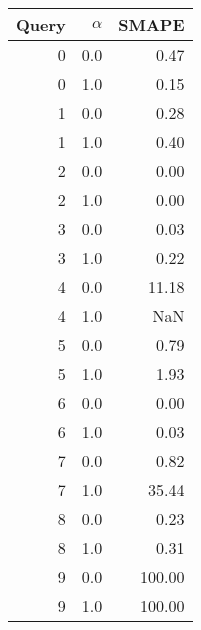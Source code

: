 \begin{tabular}{rrr}
\toprule
 Query &  $\alpha$ &  SMAPE \\
\midrule
     0 &     0.0 &   0.47 \\
     0 &     1.0 &   0.15 \\
     1 &     0.0 &   0.28 \\
     1 &     1.0 &   0.40 \\
     2 &     0.0 &   0.00 \\
     2 &     1.0 &   0.00 \\
     3 &     0.0 &   0.03 \\
     3 &     1.0 &   0.22 \\
     4 &     0.0 &  11.18 \\
     4 &     1.0 &    NaN \\
     5 &     0.0 &   0.79 \\
     5 &     1.0 &   1.93 \\
     6 &     0.0 &   0.00 \\
     6 &     1.0 &   0.03 \\
     7 &     0.0 &   0.82 \\
     7 &     1.0 &  35.44 \\
     8 &     0.0 &   0.23 \\
     8 &     1.0 &   0.31 \\
     9 &     0.0 & 100.00 \\
     9 &     1.0 & 100.00 \\
\bottomrule
\end{tabular}
